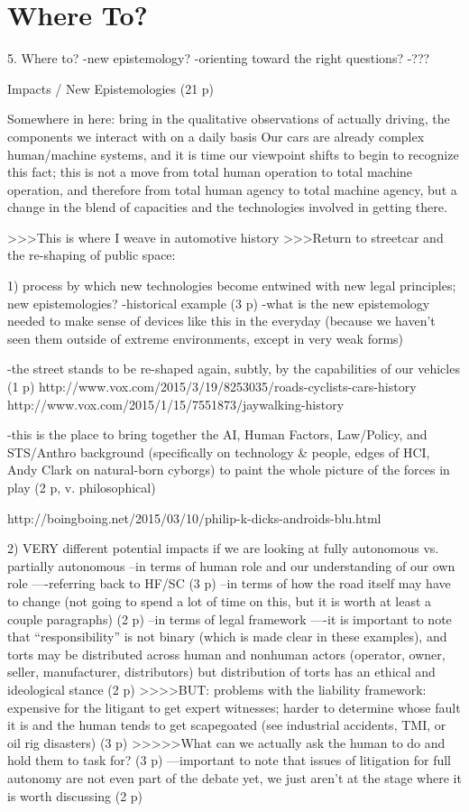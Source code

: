 \chapter{Where To?}

5. Where to?
-new epistemology?
-orienting toward the right questions?
-???

Impacts / New Epistemologies (21 p)

Somewhere in here:
bring in the qualitative observations of actually driving, the
components we interact with on a daily basis
Our cars are already complex human/machine systems, and it is time our
viewpoint shifts to begin to recognize this fact; this is not a move
from total human operation to total machine operation, and therefore
from total human agency to total machine agency, but a change in the
blend of capacities and the technologies involved in getting there.



>>>This is where I weave in automotive history 
>>>Return to streetcar and the re-shaping of public space: 

1) process by which new technologies become entwined with new legal
principles; new epistemologies?
-historical example (3 p)
-what is the new epistemology needed to make sense of devices like
this in the everyday (because we haven't seen them outside of extreme
environments, except in very weak forms)

-the street stands to be re-shaped again, subtly, by the capabilities
of our vehicles (1 p)
http://www.vox.com/2015/3/19/8253035/roads-cyclists-cars-history
http://www.vox.com/2015/1/15/7551873/jaywalking-history

-this is the place to bring together the AI, Human Factors,
Law/Policy, and STS/Anthro background (specifically on technology \&
people, edges of HCI, Andy Clark on natural-born cyborgs) to paint the
whole picture of the forces in play (2 p, v. philosophical)

http://boingboing.net/2015/03/10/philip-k-dicks-androids-blu.html

2) VERY different potential impacts if we are looking at fully
autonomous vs. partially autonomous 
--in terms of human role and our understanding of our own role
----referring back to HF/SC (3 p)
--in terms of how the road itself may have to change (not going to
spend a lot of time on this, but it is worth at least a couple
paragraphs) (2 p)
--in terms of legal framework
----it is important to note that ``responsibility'' is not binary
(which is made clear in these examples), and torts may be distributed
across human and nonhuman actors (operator, owner, seller,
manufacturer, distributors) but distribution of torts has an ethical
and ideological stance (2 p)
>>>>BUT: problems with the liability framework: expensive for the
litigant to get expert witnesses; harder to determine whose fault it
is and the human tends to get scapegoated (see industrial accidents,
TMI, or oil rig disasters) (3 p)
>>>>>What can we actually ask the human to do and hold them to task
for? (3 p)
---important to note that issues of litigation for full autonomy are
not even part of the debate yet, we just aren't at the stage where it
is worth discussing (2 p)

